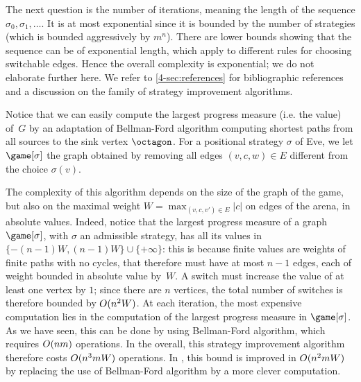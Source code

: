 The next question is the number of iterations, meaning the length of the sequence
$\sigma_0,\sigma_1,\dots$. It is at most exponential since it is bounded by the number of strategies (which is bounded aggressively by $m^n$).
There are lower bounds showing that the sequence can be of exponential length, which apply to different rules for choosing switchable edges.
Hence the overall complexity is exponential; we do not elaborate further here. 
We refer to \cref{4-sec:references} for bibliographic references and a discussion on the family of strategy improvement algorithms.

Notice that we can easily compute the largest progress measure
(i.e. the value) of~$G$ by an adaptation of Bellman-Ford algorithm
computing shortest paths from all sources to the sink vertex
$\octagon$. For a positional strategy $\sigma$ of Eve, we let
$\game[\sigma]$ the graph obtained by removing all edges
$(v,c,w)\in E$ different from the choice $\sigma(v)$. 


The complexity of this algorithm depends on the size of the graph of
the game, but also on the maximal weight
$W = \max_{(v,c,v')\in E} |c|$ on edges of the arena, in absolute
values. Indeed, notice that the largest progress measure of a graph
$\game[\sigma]$, with $\sigma$ an admissible strategy, has all its
values in $\{-(n-1)W,(n-1)W\}\cup\{+\infty\}$: this is because
finite values are weights of finite paths with no cycles, that
therefore must have at most $n-1$ edges, each of weight bounded in
absolute value by~$W$. A switch must increase the value of at
least one vertex by $1$; since there are $n$ vertices, the total
number of switches is therefore bounded by $O(n^2W)$. At
each iteration, the most expensive computation lies in the computation
of the largest progress measure in $\game[\sigma]$. As we have seen,
this can be done by using Bellman-Ford algorithm, which requires
$O(nm)$ operations. In the overall, this strategy
improvement algorithm therefore costs $O(n^3mW)$
operations. In \cite[Section 6]{Bjorklund&Vorobyov:2007}, this bound
is improved in $O(n^2 mW)$ by replacing the use of
Bellman-Ford algorithm by a more clever computation.

